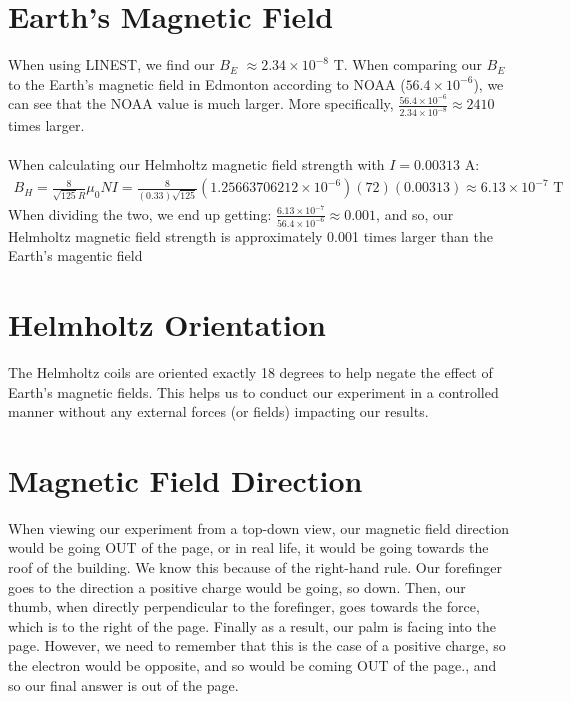 \documentclass[12pt]{article}
\begin{document}
\section{Earth's Magnetic Field}
When using LINEST, we find our $B_E$ $\approx 2.34 \times 10^{-8}$ T.
When comparing our $B_E$ to the Earth's magnetic field in Edmonton according to NOAA ($56.4 \times 10^{-6}$), we can see that
the NOAA value is much larger. More specifically, $\frac{56.4 \times 10^{-6}}{2.34 \times 10^{-8}} \approx 2410$ times larger.
\\ \\
\noindent When calculating our Helmholtz magnetic field strength with $I = 0.00313$ A:
\begin{align*}
    B_H = \frac{8}{\sqrt{125}R}\mu_0NI = \frac{8}{(0.33)\sqrt{125}}(1.25663706212 \times 10^{-6})(72)(0.00313) \approx 6.13 \times 10^{-7}\text{ T}
\end{align*}
When dividing the two, we end up getting: $\frac{6.13 \times 10^{-7}}{56.4 \times 10^{-6}} \approx 0.001$, and so, our Helmholtz magnetic
field strength is approximately 0.001 times larger than the Earth's magentic field
\section{Helmholtz Orientation}
The Helmholtz coils are oriented exactly 18 degrees to help negate the effect of Earth's magnetic fields. This helps
us to conduct our experiment in a controlled manner without any external forces (or fields) impacting our results.
\section{Magnetic Field Direction}
When viewing our experiment from a top-down view, our magnetic field direction would be going OUT of the page, or in real life, it would be going towards
the roof of the building. We know this because of the right-hand rule. Our forefinger goes to the direction a positive charge would be going, so down.
Then, our thumb, when directly perpendicular to the forefinger, goes towards the force, which is to the right of the page.
Finally as a result, our palm is facing into the page. However, we need to remember that this is the case of a positive charge, so the electron would be opposite, and so
would be coming OUT of the page., and so our final answer is out of the page.
\end{document}
